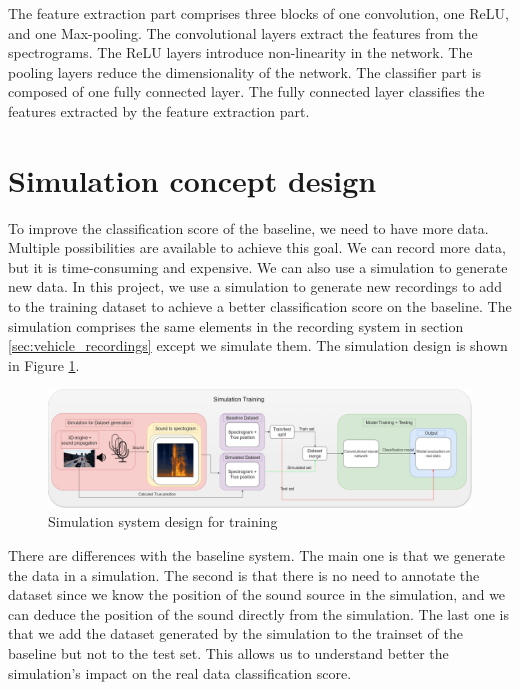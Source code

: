 The feature extraction part comprises three blocks of one convolution, one ReLU, and one Max-pooling. The convolutional layers extract the features from the spectrograms. The ReLU layers introduce non-linearity in the network. The pooling layers reduce the dimensionality of the network. The classifier part is composed of one fully connected layer. The fully connected layer classifies the features extracted by the feature extraction part. 

\section{Simulation concept design}

To improve the classification score of the baseline, we need to have more data. Multiple possibilities are available to achieve this goal. We can record more data, but it is time-consuming and expensive. We can also use a simulation to generate new data. In this project, we use a simulation to generate new recordings to add to the training dataset to achieve a better classification score on the baseline. The simulation comprises the same elements in the recording system in section \ref{sec:vehicle_recordings} except we simulate them. The simulation design is shown in Figure \ref{fig:simulation_system_design.drawio}.

\begin{figure}[H]
    \centering
    \includegraphics[width=1\textwidth]{../Images/simulation_training_design.drawio.png}
    \caption{Simulation system design for training}
    \label{fig:simulation_system_design.drawio}
\end{figure}

There are differences with the baseline system. The main one is that we generate the data in a simulation. The second is that there is no need to annotate the dataset since we know the position of the sound source in the simulation, and we can deduce the position of the sound directly from the simulation. The last one is that we add the dataset generated by the simulation to the trainset of the baseline but not to the test set. This allows us to understand better the simulation's impact on the real data classification score.

